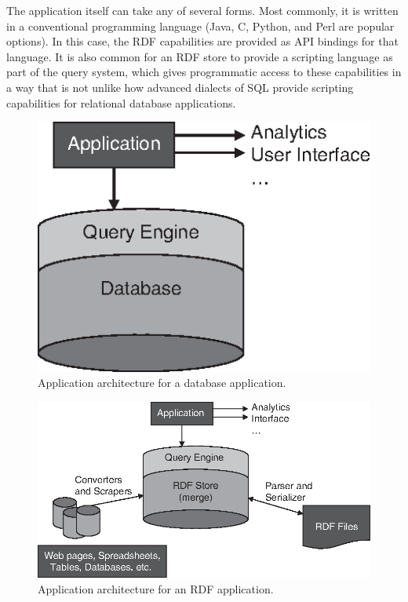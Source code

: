 The application itself can take any of several forms. Most commonly, it
is written in a conventional programming language (Java, C, Python, and
Perl are popular options). In this case, the RDF capabilities are
provided as API bindings for that language. It is also common for an RDF
store to provide a scripting language as part of the query system, which
gives programmatic access to these capabilities in a way that is not
unlike how advanced dialects of SQL provide scripting capabilities for
relational database applications.

\begin{figure}
    \centering
    \includegraphics[width=5.0in]{media/ch4/f04-01-9780123859655.eps}
    \caption{Application architecture for a database application.}
    \label{fig:ch4.1}
\end{figure}


\begin{figure}
    \centering
    \includegraphics[width=5.0in]{media/ch4/f04-02-9780123859655.eps}
    \caption{Application architecture for an RDF application.}
    \label{fig:ch4.2}
\end{figure}


